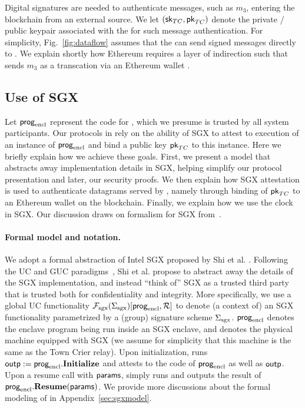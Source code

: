Digital signatures are needed to authenticate messages, such as $m_3$, entering the blockchain from an external source. We let $({\sf sk}_{TC}, {\sf pk}_{TC})$ denote the private / public keypair associated with the \encname for such message authentication. For simplicity, Fig.~\ref{fig:dataflow} assumes that the \encname can send signed messages directly to \tcont. We explain shortly how Ethereum requires a layer of indirection such that \tc sends $m_3$ as a transcation via an Ethereum wallet \tcadd.


\subsection{Use of SGX}
\label{sec:useofsgx}

Let ${\sf prog}_{\textrm{encl}}$ represent the code for \encname, which we presume is trusted by all system participants. Our protocols in \tc rely on the ability of SGX to attest to execution of an instance of ${\sf prog}_{\textrm{encl}}$ and bind a public key ${\sf pk}_{TC}$ to this instance. Here we briefly explain how we achieve these goals. First, we present a model that abstracts away implementation details in SGX, helping simplify our protocol presentation and later, our security proofs. We then explain how SGX attestation is used to authenticate datagrams served by \tcont, namely through binding of ${\sf pk}_{TC}$ to an Ethereum wallet on the blockchain. Finally, we explain how we use the clock in SGX. Our discussion draws on formalism for SGX from~\cite{ElainesSGXpaper}.



\paragraph{\bf Formal model and notation.} 
We adopt a formal abstraction
of Intel SGX proposed by Shi et al. .
Following the UC and GUC paradigms~\cite{uc,guc,juc}, Shi et al.
propose to 
abstract away the details of the SGX implementation,
and instead ``think of'' SGX
as a trusted third party that is trusted
both for confidentiality and integrity.
More specifically, we use a global UC  
functionality $\mathcal{F}_{\textrm{sgx}}({\Sigma_{\textrm{sgx}}})[{\sf prog}_{\textrm{encl}}, \mathcal{R}]$
to denote (a context of) an SGX functionality parametrized
by a (group) signature scheme ${\Sigma_{\textrm{sgx}}}$.
${\sf prog}_{\textrm{encl}}$ denotes the enclave program 
being run inside an SGX enclave, and \relay denotes the physical
machine equipped with SGX (we assume for simplicity that
this machine is the same as the Town Crier relay).
Upon initialization, \fsgx runs ${\sf outp} := {\sf prog}_{\textrm{encl}}.{\bf Initialize}$
and attests to the code of ${\sf prog}_{\textrm{encl}}$ as well as ${\sf outp}$.
Upon a resume call with ${\sf params}$, \fsgx simply runs and outputs the result of
${\sf prog}_{\textrm{encl}}.{\bf Resume}({\sf params})$.
We provide more discussions 
about the formal modeling of \fsgx in Appendix~\ref{sec:sgxmodel}.


